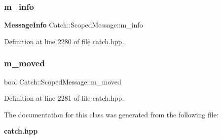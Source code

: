 \subsubsection{m\_info}
{\footnotesize\ttfamily \textbf{ Message\+Info} Catch\+::\+Scoped\+Message\+::m\+\_\+info}



Definition at line 2280 of file catch.\+hpp.

\mbox{\label{class_catch_1_1_scoped_message_a4fe5607c1f7407240a0da8405b1c12e7}} 
\subsubsection{m\_moved}
{\footnotesize\ttfamily bool Catch\+::\+Scoped\+Message\+::m\+\_\+moved}



Definition at line 2281 of file catch.\+hpp.



The documentation for this class was generated from the following file\+:\begin{DoxyCompactItemize}
\item 
\textbf{ catch.\+hpp}\end{DoxyCompactItemize}
